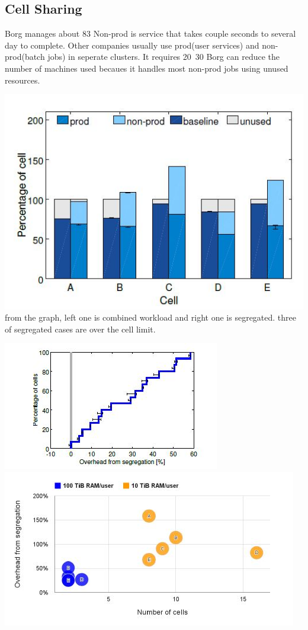 \documentclass[runningheads,a4paper]{llncs}
\begin{document}
\subsection{Cell Sharing} 
Borg manages about 83%
Non-prod is service that takes couple seconds to several day to complete. Other companies usually use prod(user services) and non-prod(batch jobs) in seperate clusters. 
It requires 20~30%
Borg can reduce the number of machines used becaues it handles most non-prod jobs using unused resources.

\includegraphics{segregation}
from the graph, left one is combined workload and right one is segregated. three of segregated cases are over the cell limit.

\includegraphics{cellsharing1}
\includegraphics{cellsharing2}
\end{document}
